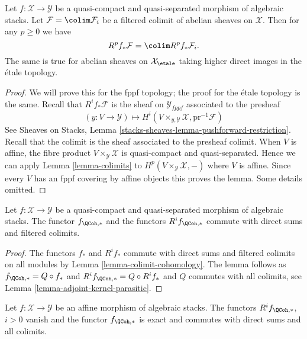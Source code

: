 \begin{lemma}
\label{lemma-colimit-cohomology}
Let $f : \mathcal{X} \to \mathcal{Y}$ be a quasi-compact and quasi-separated
morphism of algebraic stacks. Let $\mathcal{F} = \colim \mathcal{F}_i$
be a filtered colimit of abelian sheaves on $\mathcal{X}$.
Then for any $p \geq 0$ we have
$$
R^pf_*\mathcal{F} = \colim R^pf_*\mathcal{F}_i.
$$
The same is true for abelian sheaves on $\mathcal{X}_\etale$
taking higher direct images in the \'etale topology.
\end{lemma}

\begin{proof}
We will prove this for the fppf topology; the proof for the \'etale
topology is the same. Recall that $R^if_*\mathcal{F}$ is the sheaf on
$\mathcal{Y}_{fppf}$ associated to the presheaf
$$
(y : V \to \mathcal{Y})
\longmapsto
H^i(V \times_{y, \mathcal{Y}} \mathcal{X}, \text{pr}^{-1}\mathcal{F})
$$
See
Sheaves on Stacks, Lemma \ref{stacks-sheaves-lemma-pushforward-restriction}.
Recall that the colimit is the sheaf associated to the presheaf colimit.
When $V$ is affine, the fibre product $V \times_\mathcal{Y} \mathcal{X}$
is quasi-compact and quasi-separated. Hence we can apply
Lemma \ref{lemma-colimits} to $H^p(V \times_\mathcal{Y} \mathcal{X}, -)$
where $V$ is affine. Since every $V$ has an fppf covering by
affine objects this proves the lemma. Some details omitted.
\end{proof}

\begin{lemma}
\label{lemma-quasi-coherent-pushforward-direct-sums}
Let $f : \mathcal{X} \to \mathcal{Y}$ be a quasi-compact and quasi-separated
morphism of algebraic stacks. The functor $f_{\QCoh, *}$
and the functors $R^if_{\QCoh, *}$ commute with direct sums
and filtered colimits.
\end{lemma}

\begin{proof}
The functors $f_*$ and $R^if_*$ commute with direct sums and filtered
colimits on all modules by Lemma \ref{lemma-colimit-cohomology}.
The lemma follows as $f_{\QCoh, *} = Q \circ f_*$ and
$R^if_{\QCoh, *} = Q \circ R^if_*$ and $Q$ commutes with
all colimits, see Lemma \ref{lemma-adjoint-kernel-parasitic}.
\end{proof}

\begin{lemma}
\label{lemma-quasi-coherent-pushforward-affine}
Let $f : \mathcal{X} \to \mathcal{Y}$ be an affine morphism of algebraic
stacks. The functors $R^if_{\QCoh, *}$, $i > 0$ vanish and the functor
$f_{\QCoh, *}$ is exact and commutes with direct sums and all colimits.
\end{lemma}

